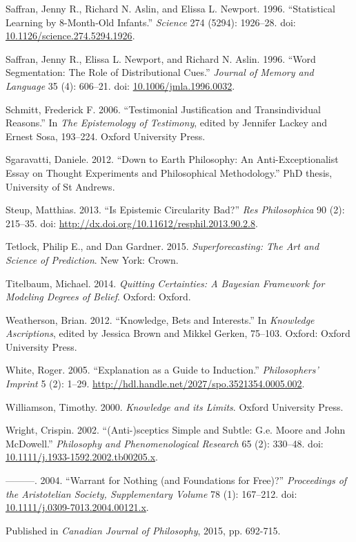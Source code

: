 \documentclass[
  10pt,
  letterpaper,
  DIV=11,
  numbers=noendperiod,
  twoside]{scrartcl}
\newlength{\cslhangindent}
\newenvironment{CSLReferences}[2] %
 {\begin{list}{}{%
  \setlength{\itemindent}{0pt}
  \setlength{\leftmargin}{0pt}
  \setlength{\parsep}{0pt}
  \ifodd #1
   \setlength{\leftmargin}{\cslhangindent}
   \setlength{\itemindent}{-1\cslhangindent}
  \fi
  \setlength{\itemsep}{#2\baselineskip}}}
 {\end{list}}
\begin{document}
\begin{CSLReferences}{1}{0}
Saffran, Jenny R., Richard N. Aslin, and Elissa L. Newport. 1996.
{``Statistical Learning by 8-Month-Old Infants.''} \emph{Science} 274
(5294): 1926--28. doi:
\href{https://doi.org/10.1126/science.274.5294.1926}{10.1126/science.274.5294.1926}.

Saffran, Jenny R., Elissa L. Newport, and Richard N. Aslin. 1996.
{``Word Segmentation: The Role of Distributional Cues.''} \emph{Journal
of Memory and Language} 35 (4): 606--21. doi:
\href{https://doi.org/10.1006/jmla.1996.0032}{10.1006/jmla.1996.0032}.

Schmitt, Frederick F. 2006. {``{T}estimonial {J}ustification and
{T}ransindividual {R}easons.''} In \emph{{T}he {E}pistemology of
{T}estimony}, edited by Jennifer Lackey and Ernest Sosa, 193--224.
{O}xford {U}niversity {P}ress.

Sgaravatti, Daniele. 2012. {``Down to Earth Philosophy: An
Anti-Exceptionalist Essay on Thought Experiments and Philosophical
Methodology.''} PhD thesis, University of St Andrews.

Steup, Matthias. 2013. {``Is Epistemic Circularity Bad?''} \emph{Res
Philosophica} 90 (2): 215--35. doi:
\url{http://dx.doi.org/10.11612/resphil.2013.90.2.8}.

Tetlock, Philip E., and Dan Gardner. 2015. \emph{Superforecasting: The
Art and Science of Prediction}. New York: Crown.

Titelbaum, Michael. 2014. \emph{Quitting Certainties: A Bayesian
Framework for Modeling Degrees of Belief}. Oxford: Oxford.

Weatherson, Brian. 2012. {``Knowledge, Bets and Interests.''} In
\emph{Knowledge Ascriptions}, edited by Jessica Brown and Mikkel Gerken,
75--103. Oxford: Oxford University Press.

White, Roger. 2005. {``Explanation as a Guide to Induction.''}
\emph{Philosophers' Imprint} 5 (2): 1--29.
\url{http://hdl.handle.net/2027/spo.3521354.0005.002}.

Williamson, Timothy. 2000. \emph{{Knowledge and its Limits}}. Oxford
University Press.

Wright, Crispin. 2002. {``(Anti-)sceptics Simple and Subtle: G.e. Moore
and John McDowell.''} \emph{Philosophy and Phenomenological Research} 65
(2): 330--48. doi:
\href{https://doi.org/10.1111/j.1933-1592.2002.tb00205.x}{10.1111/j.1933-1592.2002.tb00205.x}.

---------. 2004. {``Warrant for Nothing (and Foundations for Free)?''}
\emph{Proceedings of the Aristotelian Society, Supplementary Volume} 78
(1): 167--212. doi:
\href{https://doi.org/10.1111/j.0309-7013.2004.00121.x}{10.1111/j.0309-7013.2004.00121.x}.

\end{CSLReferences}



\noindent Published in\emph{
Canadian Journal of Philosophy}, 2015, pp. 692-715.
\end{document}
